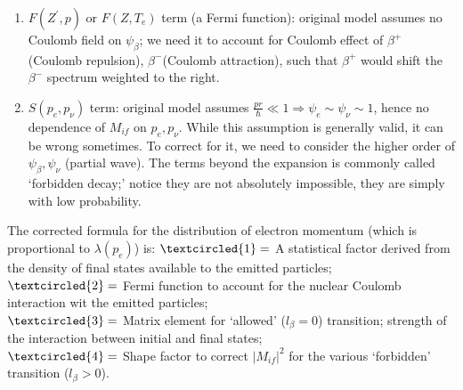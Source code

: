 \documentclass{school-22.101-notes}
\begin{document}
\begin{enumerate}
\item $F(Z^{\prime},p)$ or $F(Z,T_e)$ term (a Fermi function): original model assumes no Coulomb field on $\psi_{\beta}$; we need it to account for Coulomb effect of $\beta^+$ (Coulomb repulsion), $\beta^-$(Coulomb attraction), such that $\beta^+$ would shift the $\beta^-$ spectrum weighted to the right.
\item $S(p_e, p_{\nu})$ term: original model assumes $\frac{pr}{\hbar} \ll 1 \Rightarrow \psi_e \sim \psi_{\nu} \sim 1$, hence no dependence of $M_{if}$ on $p_e, p_{\nu}$. While this assumption is generally valid, it can be wrong sometimes. To correct for it, we need to consider the higher order of $\psi_{\beta}, \psi_{\nu}$ (partial wave). The terms beyond the expansion is commonly called `forbidden decay;' notice they are not absolutely impossible, they are simply with low probability. 
\end{enumerate}
The corrected formula for the distribution of electron momentum (which is proportional to $\lambda(p_e)$) is:
$\textcircled{1}=$ A statistical factor derived from the density of final states available to the emitted particles; \\
$\textcircled{2}=$ Fermi function to account for the nuclear Coulomb interaction wit the emitted particles;\\
$\textcircled{3}=$ Matrix element for `allowed' ($l_{\beta} = 0$) transition; strength of the interaction between initial and final states; \\
$\textcircled{4}=$ Shape factor to correct $|M_{if}|^2$ for the various `forbidden' transition ($l_{\beta} >0$). 
\end{document}
